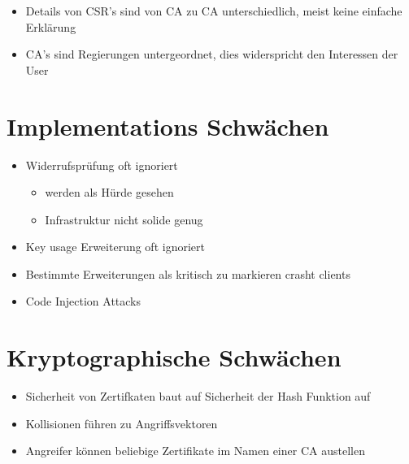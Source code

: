   \begin{itemize}
    \item Details von CSR's sind von CA zu CA unterschiedlich, meist keine einfache Erklärung
    \item CA's sind Regierungen untergeordnet, dies widerspricht den Interessen der User
  \end{itemize}


\section{Implementations Schwächen}

  \begin{itemize}
    \item Widerrufsprüfung oft ignoriert
        \begin{itemize}
            \item werden als Hürde gesehen
            \item Infrastruktur nicht solide genug
        \end{itemize}
  \end{itemize}



  \begin{itemize}
    \item Key usage Erweiterung oft ignoriert
    \item Bestimmte Erweiterungen als kritisch zu markieren crasht clients
    \item Code Injection Attacks
  \end{itemize}


\section{Kryptographische Schwächen}

  \begin{itemize}
      \item Sicherheit von Zertifkaten baut auf Sicherheit der Hash Funktion auf
      \item Kollisionen führen zu Angriffsvektoren
      \item Angreifer können beliebige Zertifikate im Namen einer CA austellen
  \end{itemize}

